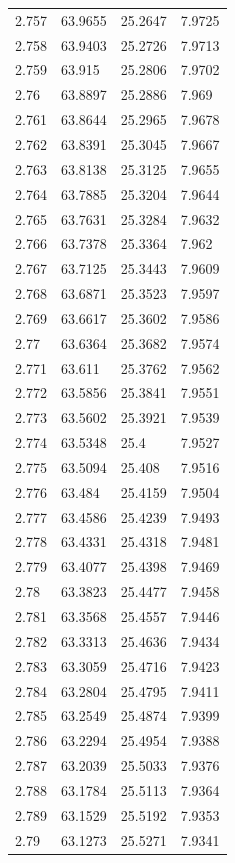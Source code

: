 \begin{tabular}{llll}
2.757 & 63.9655 & 25.2647 & 7.9725 \\
2.758 & 63.9403 & 25.2726 & 7.9713 \\
2.759 & 63.915 & 25.2806 & 7.9702 \\
2.76 & 63.8897 & 25.2886 & 7.969 \\
2.761 & 63.8644 & 25.2965 & 7.9678 \\
2.762 & 63.8391 & 25.3045 & 7.9667 \\
2.763 & 63.8138 & 25.3125 & 7.9655 \\
2.764 & 63.7885 & 25.3204 & 7.9644 \\
2.765 & 63.7631 & 25.3284 & 7.9632 \\
2.766 & 63.7378 & 25.3364 & 7.962 \\
2.767 & 63.7125 & 25.3443 & 7.9609 \\
2.768 & 63.6871 & 25.3523 & 7.9597 \\
2.769 & 63.6617 & 25.3602 & 7.9586 \\
2.77 & 63.6364 & 25.3682 & 7.9574 \\
2.771 & 63.611 & 25.3762 & 7.9562 \\
2.772 & 63.5856 & 25.3841 & 7.9551 \\
2.773 & 63.5602 & 25.3921 & 7.9539 \\
2.774 & 63.5348 & 25.4 & 7.9527 \\
2.775 & 63.5094 & 25.408 & 7.9516 \\
2.776 & 63.484 & 25.4159 & 7.9504 \\
2.777 & 63.4586 & 25.4239 & 7.9493 \\
2.778 & 63.4331 & 25.4318 & 7.9481 \\
2.779 & 63.4077 & 25.4398 & 7.9469 \\
2.78 & 63.3823 & 25.4477 & 7.9458 \\
2.781 & 63.3568 & 25.4557 & 7.9446 \\
2.782 & 63.3313 & 25.4636 & 7.9434 \\
2.783 & 63.3059 & 25.4716 & 7.9423 \\
2.784 & 63.2804 & 25.4795 & 7.9411 \\
2.785 & 63.2549 & 25.4874 & 7.9399 \\
2.786 & 63.2294 & 25.4954 & 7.9388 \\
2.787 & 63.2039 & 25.5033 & 7.9376 \\
2.788 & 63.1784 & 25.5113 & 7.9364 \\
2.789 & 63.1529 & 25.5192 & 7.9353 \\
2.79 & 63.1273 & 25.5271 & 7.9341 \\

\end{tabular}
